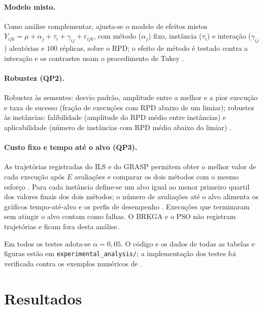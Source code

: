 \paragraph{Modelo misto.} Como análise complementar, ajusta-se o modelo de efeitos mistos
$Y_{ijk}=\mu+\alpha_j+\tau_i+\gamma_{ij}+\varepsilon_{ijk}$, com método ($\alpha_j$) fixo, instância
($\tau_i$) e interação ($\gamma_{ij}$) aleatórias e $100$ réplicas, sobre o RPD; o efeito de método é
testado contra a interação e os contrastes usam o procedimento de Tukey
\cite[Sec.~10.2.2]{chiarandini2010mixed}.

\paragraph{Robustez (QP2).} Robustez às sementes: desvio padrão, amplitude entre a melhor e a pior
execução e taxa de sucesso (fração de execuções com RPD abaixo de um limiar); robustez às instâncias:
falibilidade (amplitude do RPD médio entre instâncias) e aplicabilidade (número de instâncias com RPD
médio abaixo do limiar) \cite[Sec.~4.2]{eiben2011parameter}.

\paragraph{Custo fixo e tempo até o alvo (QP3).} As trajetórias registradas do ILS e do GRASP permitem
obter o melhor valor de cada execução após $E$ avaliações e comparar os dois métodos com o mesmo
esforço \cite[Secs.~4.3 e 4.4]{beiranvand2017best}. Para cada instância define-se um alvo igual ao
menor primeiro quartil dos valores finais dos dois métodos; o número de avaliações até o alvo alimenta
os gráficos tempo-até-alvo \cite{aiex2005tttplots} e os perfis de desempenho
\cite[Sec.~5]{beiranvand2017best}. Execuções que terminaram sem atingir o alvo contam como falhas.
O BRKGA e o PSO não registram trajetórias e ficam fora desta análise.

Em todos os testes adota-se $\alpha=0{,}05$. O código e os dados de todas as tabelas e figuras estão em
\texttt{experimental\_analysis/}; a implementação dos testes foi verificada contra os exemplos
numéricos de \cite{derrac2011practical}.

\section{Resultados}
\label{sec:resultados}

